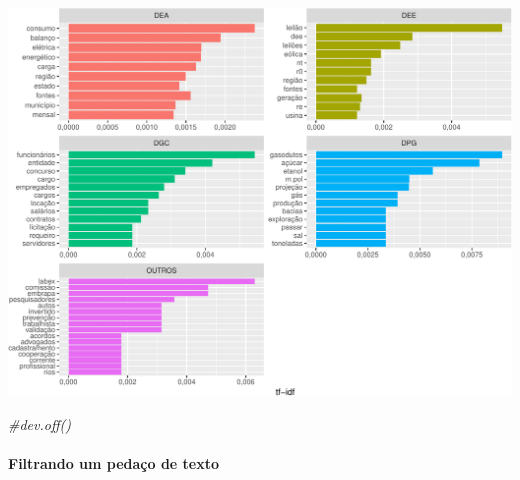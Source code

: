 \documentclass[]{article}
\newenvironment{Shaded}{\begin{snugshade}}{\end{snugshade}}
\newcommand{\KeywordTok}[1]{\textcolor[rgb]{0.13,0.29,0.53}{\textbf{#1}}}
\newcommand{\StringTok}[1]{\textcolor[rgb]{0.31,0.60,0.02}{#1}}
\newcommand{\CommentTok}[1]{\textcolor[rgb]{0.56,0.35,0.01}{\textit{#1}}}
\newcommand{\OperatorTok}[1]{\textcolor[rgb]{0.81,0.36,0.00}{\textbf{#1}}}
\newcommand{\NormalTok}[1]{#1}
\let\oldparagraph\paragraph
\renewcommand{\paragraph}[1]{\oldparagraph{#1}\mbox{}}
\begin{document}
\includegraphics{markdown_v31_files/figure-latex/02_freq_palavras_dir-1.pdf}

\begin{Shaded}
\begin{Highlighting}[]
\CommentTok{#dev.off()}
\end{Highlighting}
\end{Shaded}

\paragraph{Filtrando um pedaço de
texto}\label{filtrando-um-pedaco-de-texto}

\begin{Shaded}
\end{Shaded}
\end{document}
